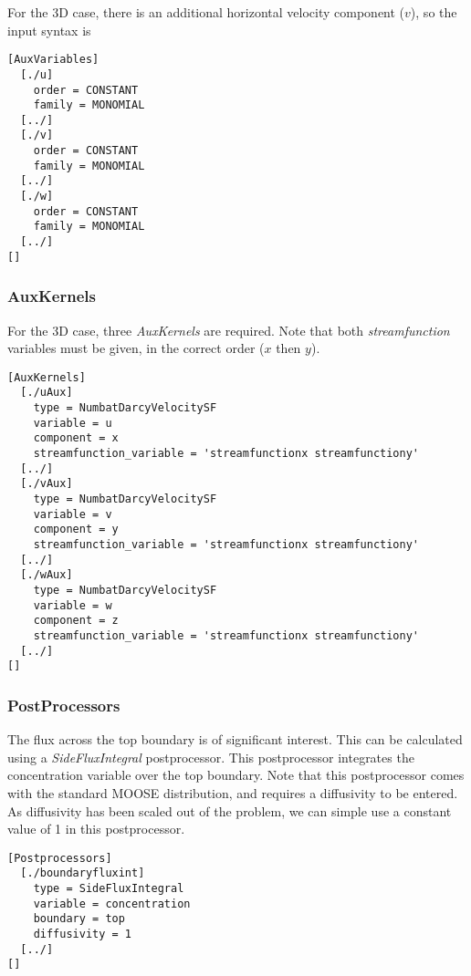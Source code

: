 \documentclass[11pt, a4paper]{csiroreport2012}
\begin{document}
For the 3D case, there is an additional horizontal velocity component ($v$), so the input syntax is
\begin{shaded}
\begin{verbatim}
[AuxVariables]
  [./u]
    order = CONSTANT
    family = MONOMIAL
  [../]
  [./v]
    order = CONSTANT
    family = MONOMIAL
  [../]
  [./w]
    order = CONSTANT
    family = MONOMIAL
  [../]
[]
\end{verbatim}
\end{shaded}

\subsubsection*{AuxKernels}

For the 3D case, three \emph{AuxKernels} are required. Note that both \emph{streamfunction} variables must be given, in the correct order ($x$ then $y$).
\begin{shaded}
\begin{verbatim}
[AuxKernels]
  [./uAux]
    type = NumbatDarcyVelocitySF
    variable = u
    component = x
    streamfunction_variable = 'streamfunctionx streamfunctiony'
  [../]
  [./vAux]
    type = NumbatDarcyVelocitySF
    variable = v
    component = y
    streamfunction_variable = 'streamfunctionx streamfunctiony'
  [../]
  [./wAux]
    type = NumbatDarcyVelocitySF
    variable = w
    component = z
    streamfunction_variable = 'streamfunctionx streamfunctiony'
  [../]
[]
\end{verbatim}
\end{shaded}

\subsubsection*{PostProcessors}

The flux across the top boundary is of significant interest. This can be calculated using a \emph{SideFluxIntegral} postprocessor. This postprocessor integrates the concentration variable over the top boundary. Note that this postprocessor comes with the standard MOOSE distribution, and requires a diffusivity to be entered. As diffusivity has been scaled out of the problem, we can simple use a constant value of 1 in this postprocessor.

\begin{shaded}
\begin{verbatim}
[Postprocessors]
  [./boundaryfluxint]
    type = SideFluxIntegral
    variable = concentration
    boundary = top
    diffusivity = 1
  [../]
[]
\end{verbatim}
\end{shaded}
\end{document}
